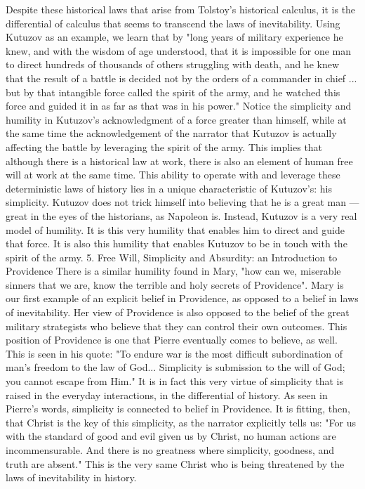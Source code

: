 Despite these historical laws that arise from Tolstoy's historical calculus, it is the differential of calculus that seems to transcend the laws of inevitability.  Using Kutuzov as an example, we learn that by "long years of military experience he knew, and with the wisdom of age understood, that it is impossible for one man to direct hundreds of thousands of others struggling with death, and he knew that the result of a battle is decided not by the orders of a commander in chief ... but by that intangible force called the spirit of the army, and he watched this force and guided it in as far as that was in his power."  Notice the simplicity and humility in Kutuzov's acknowledgment of a force greater than himself, while at the same time the acknowledgement of the narrator that Kutuzov is actually affecting the battle by leveraging the spirit of the army. This implies that although there is a historical law at work, there is also an element of human free will at work at the same time.
This ability to operate with and leverage these deterministic laws of history lies in a unique characteristic of Kutuzov’s: his simplicity. Kutuzov does not trick himself into believing that he is a great man — great in the eyes of the historians, as Napoleon is.  Instead, Kutuzov is a very real model of humility. It is this very humility that enables him to direct and guide that force. It is also this humility that enables Kutuzov to be in touch with the spirit of the army. 
5. Free Will, Simplicity and Absurdity: an Introduction to Providence
There is a similar humility found in Mary, "how can we, miserable sinners that we are, know the terrible and holy secrets of Providence".  Mary is our first example of an explicit belief in Providence, as opposed to a belief in laws of inevitability. Her view of Providence is also opposed to the belief of the great military strategists who believe that they can control their own outcomes. This position of Providence is one that Pierre eventually comes to believe, as well. This is seen in his quote: "To endure war is the most difficult subordination of man's freedom to the law of God... Simplicity is submission to the will of God; you cannot escape from Him."  It is in fact this very virtue of simplicity that is raised in the everyday interactions, in the differential of history. As seen in Pierre’s words, simplicity is connected to belief in Providence. It is fitting, then, that Christ is the key of this simplicity, as the narrator explicitly tells us: "For us with the standard of good and evil given us by Christ, no human actions are incommensurable.  And there is no greatness where simplicity, goodness, and truth are absent."  This is the very same Christ who is being threatened by the laws of inevitability in history.
